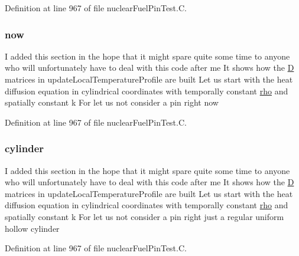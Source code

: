 Definition at line 967 of file nuclear\+Fuel\+Pin\+Test.\+C.

\mbox{\label{nuclearFuelPinTest_8C_a09404a3c5e8ea04b3e44ae4cb130f396}} 
\subsubsection{\texorpdfstring{now}{now}}
{\footnotesize\ttfamily I added this section in the hope that it might spare quite some time to anyone who will unfortunately have to deal with this code after me It shows how the \hyperlink{setXSFieldsSN_8H_a70ac93a527a85b4edf386830643d1561}{D} matrices in update\+Local\+Temperature\+Profile are built Let us start with the heat diffusion equation in cylindrical coordinates with temporally constant \hyperlink{EEqn__1pl_8H_ac955f87ac2b79f02f420cae087fc52b1}{rho} and spatially constant k For let us not consider a pin right now}



Definition at line 967 of file nuclear\+Fuel\+Pin\+Test.\+C.

\mbox{\label{nuclearFuelPinTest_8C_aa5e8becd7f504abaf6e34b6dcd491e94}} 
\subsubsection{\texorpdfstring{cylinder}{cylinder}}
{\footnotesize\ttfamily I added this section in the hope that it might spare quite some time to anyone who will unfortunately have to deal with this code after me It shows how the \hyperlink{setXSFieldsSN_8H_a70ac93a527a85b4edf386830643d1561}{D} matrices in update\+Local\+Temperature\+Profile are built Let us start with the heat diffusion equation in cylindrical coordinates with temporally constant \hyperlink{EEqn__1pl_8H_ac955f87ac2b79f02f420cae087fc52b1}{rho} and spatially constant k For let us not consider a pin right just a regular uniform hollow cylinder}



Definition at line 967 of file nuclear\+Fuel\+Pin\+Test.\+C.

